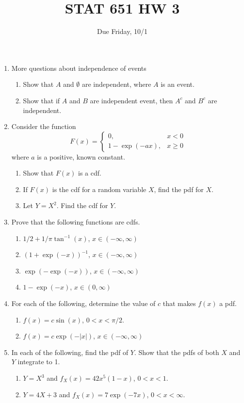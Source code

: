 \documentclass[12pt]{article}
\begin{document}
\title{STAT 651 HW 3}
\author{Due Friday, 10/1}
\date{}
\maketitle

\begin{enumerate}
\item More questions about independence of events
  \begin{enumerate}
  \item Show that $A$ and $\emptyset$ are independent, where $A$ is an event.
  \item Show that if $A$ and $B$ are independent event, then $A^c$ and $B^c$ are independent.
  \end{enumerate}

\item
Consider the function 
\[
F(x) = \begin{cases}
    0, & x < 0 \\
    1-\exp(-ax), & x \ge 0
\end{cases}
\]
where $a$ is a positive, known constant.
\begin{enumerate}
\item Show that $F(x)$ is a cdf.
\item If $F(x)$ is the cdf for a random variable $X$, find the pdf for $X$.
\item Let $Y = X^2$.  Find the cdf for $Y$.
\end{enumerate}

\item
Prove that the following functions are cdfs.
  \begin{enumerate}
  \item $1/2 + 1/\pi \tan^{-1}(x)$, $x \in (-\infty,\infty)$
  \item $(1+\exp(-x))^{-1}$, $x\in (-\infty,\infty)$
  \item $\exp(-\exp(-x))$,  $x\in (-\infty,\infty)$
  \item $1-\exp(-x)$, $x\in (0,\infty)$
  \end{enumerate}

\item
For each of the following, determine the value of $c$ that makes $f(x)$ a pdf.
\begin{enumerate}
\item $f(x) = c \sin(x)$, $0 < x < \pi/2$.
\item $f(x) = c\exp(-|x|)$, $x\in (-\infty,\infty)$
\end{enumerate}

\item
In each of the following, find the pdf of $Y$. Show that the pdfs of both $X$ and $Y$
integrate to 1.
\begin{enumerate}
\item $Y=X^3$ and $f_X(x) = 42x^5(1-x)$, $0<x<1$.
\item $Y=4X+3$ and $f_X(x) = 7\exp(-7x)$, $0<x<\infty$.
\end{enumerate}

\end{enumerate}
\end{document}
